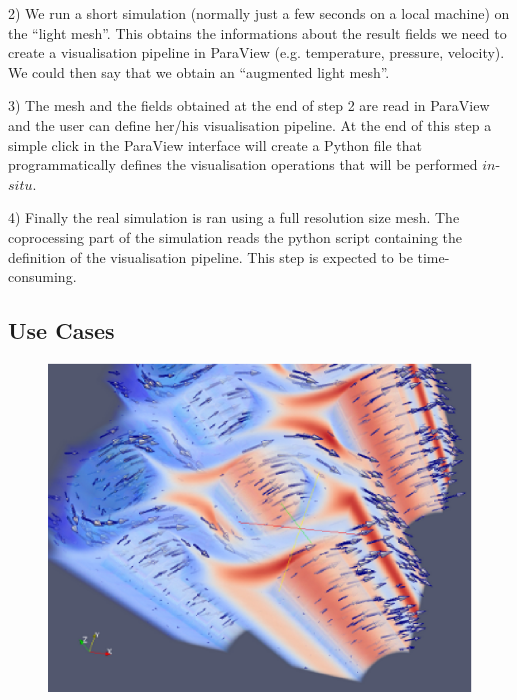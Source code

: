 2) We run a short simulation (normally just a few seconds on a local machine) on the ``light mesh''.
This obtains the informations about the result fields we need to create a
visualisation pipeline in ParaView (e.g. temperature, pressure, velocity). We
could then say that we obtain an ``augmented light mesh''.


3) The mesh and the fields obtained at the end of step 2 are read in ParaView
and the user can define her/his visualisation pipeline. At the end of this step
a simple click in the ParaView interface will create a Python file that
programmatically defines the visualisation operations that will be performed
$in$-$situ$.


4) Finally the real simulation is ran using a full resolution size mesh. The
coprocessing part of the simulation reads the python script containing the
definition of the visualisation pipeline. This step is expected to be
time-consuming.

\subsection{Use Cases}
\begin{figure}
\vspace{-20pt}
\includegraphics[scale=0.42]{pictures/res.eps}
\label{fig:res}
\vspace{-20pt}
\end{figure}


